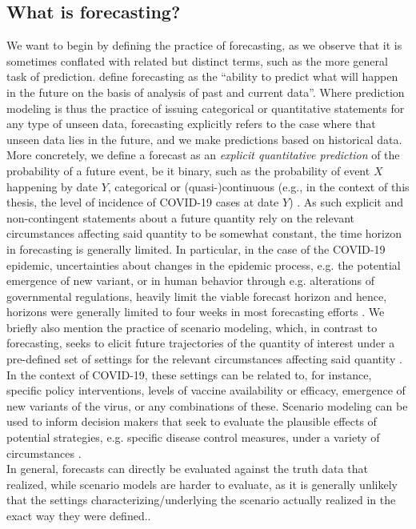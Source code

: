 \subsection{What is forecasting?}
We want to begin by defining the practice of forecasting, as we observe that it is  sometimes conflated with related but distinct terms, such as the more general task of prediction. \cite{moran_epidemic_2016} define forecasting as the ``ability to predict what will happen in the future on the basis of analysis of past and current data''. Where prediction modeling is thus the practice of issuing categorical or quantitative statements for any type of unseen data, forecasting explicitly refers to the case where that unseen data lies in the future, and we make predictions based on historical data.\\
More concretely, we define a forecast as an \textit{explicit quantitative prediction} of the probability of a future event, be it binary, such as the probability of event $X$ happening by date $Y$, categorical or (quasi-)continuous (e.g., in the context of this thesis, the level of incidence of COVID-19 cases at date $Y$) \citep{reich_collaborative_2022}. As such explicit and non-contingent statements about a future quantity rely on the relevant circumstances affecting said quantity to be somewhat constant, the time horizon in forecasting is generally limited. In particular, in the case of the COVID-19 epidemic, uncertainties about changes in the epidemic process, e.g. the potential emergence of new variant, or in human behavior through e.g. alterations of governmental regulations, heavily limit the viable forecast horizon and hence, horizons were generally limited to four weeks in most forecasting efforts \cite{reich_collaborative_2022}. %
We briefly also mention the practice of scenario modeling, which, in contrast to forecasting, seeks to elicit future trajectories of the quantity of interest under a pre-defined set of settings for the relevant circumstances affecting said quantity \citep{reich_collaborative_2022}. In the context of COVID-19, these settings can be related to, for instance, specific policy interventions, levels of vaccine availability or efficacy, emergence of new variants of the virus, or any combinations of these. Scenario modeling can be used to inform decision makers that seek to evaluate the plausible effects of potential strategies, e.g. specific disease control measures, under a variety of circumstances \cite{reich_collaborative_2022}.\\ 
In general, forecasts can directly be evaluated against the truth data that realized, while scenario models are harder to evaluate, as it is generally unlikely that the settings characterizing/underlying the scenario actually realized in the exact way they were defined..
